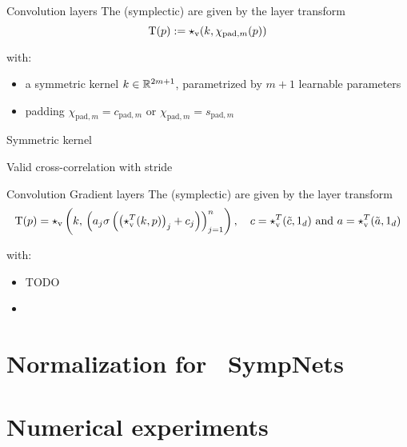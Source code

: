 \begin{frame}[c]{Convolution layers}
  The (symplectic)  are given by the layer transform
  \begin{equation*}
    \mathrm{T}(p) := \star_{\text{v}}(k,\chi_{\text{pad},m}(p))
  \end{equation*}

  with:
  \begin{itemize}
    \item a symmetric kernel $k \in \mathbb{R}^{2m+1}$, 
    parametrized by $m+1$ learnable parameters
    \item padding
    $\chi_{\text{pad},m} = c_{\text{pad},m}$ or $\chi_{\text{pad},m} = s_{\text{pad},m}$
  \end{itemize}
\end{frame}

\begin{frame}{Symmetric kernel}
\end{frame}

\begin{frame}{Valid cross-correlation with stride}
  
\end{frame}

\begin{frame}[c]{Convolution Gradient layers}
  The (symplectic)  are given by the layer transform
  \begin{equation*}
    \mathrm{T}(p) = \star_{\text{v}} \left( k, \, 
    \left( a_j \sigma \left( \left( \star_{\text{v}}^T(k,p) \right)_j + c_j \right) \right)_{j=1}^n \right),
		\quad c = \star_{\text{v}}^T(\tilde{c},1_d) 
		\text{ and } a = \star_{\text{v}}^T(\tilde{a},1_d)
  \end{equation*}

  with:
  \begin{itemize}
    \item TODO
    \item {}
  \end{itemize}
\end{frame}

\section{Normalization for ~\newline SympNets}

\section{Numerical experiments}

